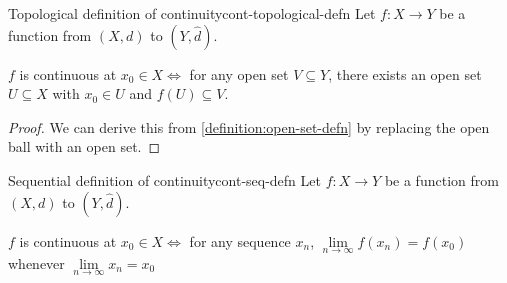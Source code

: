 \documentclass{article}
\numberwithin{equation}{section}
\numberwithin{figure}{section}
\begin{document}
\begin{definition}{Topological definition of continuity}{cont-topological-defn}
    Let $f: X\to Y$ be a function from $(X,d)$ to $(Y,\hat{d})$.
    
    $f$ is continuous at $x_0 \in X \iff$ for any open set $V \subseteq Y$, there exists an open set $U \subseteq X$ with $x_0 \in U$ and $f(U)\subseteq V$.
    \begin{proof}
        We can derive this from \cref{definition:open-set-defn} by replacing the open ball with an open set.
    \end{proof}
\end{definition}
\begin{definition}{Sequential definition of continuity}{cont-seq-defn}
    Let $f: X\to Y$ be a function from $(X,d)$ to $(Y,\hat{d})$.
    
    $f$ is continuous at $x_0 \in X \iff$ for any sequence $x_n$,  $\lim\limits_{n \to \infty}f(x_n) = f(x_0) $ whenever $\lim\limits_{n \to \infty}x_n = x_0$
\end{definition}
\end{document}

